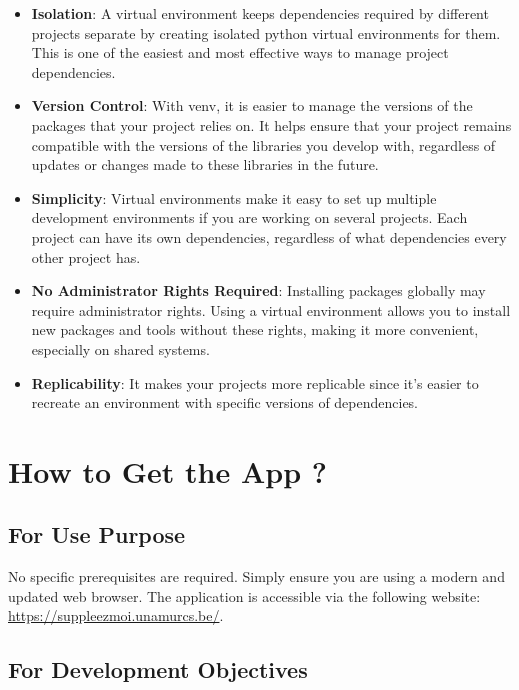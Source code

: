 \documentclass[12pt]{article}
\begin{document}
\begin{itemize}
    \item \textbf{Isolation}: A virtual environment keeps dependencies required by different projects separate by creating isolated python virtual environments for them. This is one of the easiest and most effective ways to manage project dependencies.

    \item \textbf{Version Control}: With venv, it is easier to manage the versions of the packages that your project relies on. It helps ensure that your project remains compatible with the versions of the libraries you develop with, regardless of updates or changes made to these libraries in the future.

    \item \textbf{Simplicity}: Virtual environments make it easy to set up multiple development environments if you are working on several projects. Each project can have its own dependencies, regardless of what dependencies every other project has.

    \item \textbf{No Administrator Rights Required}: Installing packages globally may require administrator rights. Using a virtual environment allows you to install new packages and tools without these rights, making it more convenient, especially on shared systems.

    \item \textbf{Replicability}: It makes your projects more replicable since it’s easier to recreate an environment with specific versions of dependencies.
\end{itemize}

\section{How to Get the App ?}

\subsection{For Use Purpose}
No specific prerequisites are required. Simply ensure you are using a modern and updated web browser. The application is accessible via the following website: \url{https://suppleezmoi.unamurcs.be/}.

\subsection{For Development Objectives}
\end{document}
